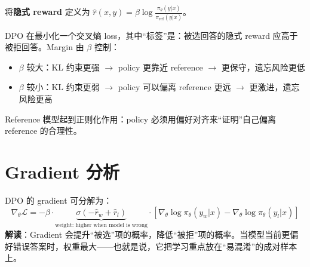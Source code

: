 \begin{intuitionbox}[DPO 实际在做什么]
将\textbf{隐式 reward} 定义为 $\hat{r}(x,y) = \beta\log\frac{\pi_\theta(y|x)}{\pi_\text{ref}(y|x)}$。

DPO 在最小化一个交叉熵 loss，其中“标签”是：被选回答的隐式 reward 应高于被拒回答。Margin 由 $\beta$ 控制：

\begin{itemize}
  \item $\beta$ 较大：KL 约束更强 $\rightarrow$ policy 更靠近 reference $\rightarrow$ 更保守，遗忘风险更低
  \item $\beta$ 较小：KL 约束更弱 $\rightarrow$ policy 可以偏离 reference 更远 $\rightarrow$ 更激进，遗忘风险更高
\end{itemize}

Reference 模型起到正则化作用：policy 必须用偏好对齐来“证明”自己偏离 reference 的合理性。
\end{intuitionbox}

\section{Gradient 分析}
\label{gradient-analysis}

DPO 的 gradient 可分解为：
\begin{equation}
\nabla_\theta \mathcal{L} = -\beta \cdot \underbrace{\sigma(-\hat{r}_w + \hat{r}_l)}_{\text{weight: higher when model is wrong}} \cdot \left[\nabla_\theta \log\pi_\theta(y_w|x) - \nabla_\theta \log\pi_\theta(y_l|x)\right]
\end{equation}
\textbf{解读}：Gradient 会提升“被选”项的概率，降低“被拒”项的概率。当模型当前更偏好错误答案时，权重最大——也就是说，它把学习重点放在“易混淆”的成对样本上。


